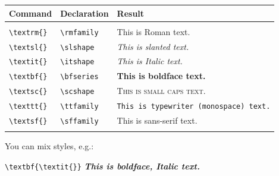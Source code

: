 \documentclass{article}
\begin{document}
\begin{tabular}{lll}

\textbf{Command} & \textbf{Declaration} & \textbf{Result} \\

\hline

& \\

\verb+\textrm{}+ & \verb+\rmfamily+ & \textrm{This is Roman text.}  \\

\verb+\textsl{}+ & \verb+\slshape+ & \textsl{This is slanted text.} \\

\verb+\textit{}+ & \verb+\itshape+ & \textit{This is Italic text.} \\

\verb+\textbf{}+ & \verb+\bfseries+ & \textbf{This is boldface text.} \\

\verb+\textsc{}+ & \verb+\scshape+ & \textsc{This is small caps text.} \\

\verb+\texttt{}+ & \verb+\ttfamily+ & \texttt{This is typewriter (monospace) text.} \\

\verb+\textsf{}+ & \verb+\sffamily+ & \textsf{This is sans-serif text.} \\

& \\

\end{tabular}

You can mix styles, e.g.:

\verb+\textbf{\textit{}}+ \textbf{\textit{This is boldface, Italic text.}} \\
\end{document}
